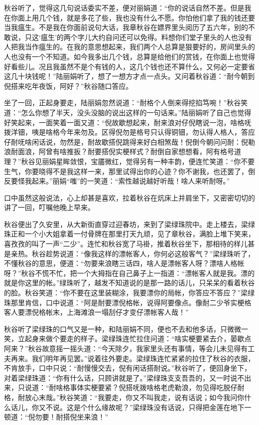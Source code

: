 \documentclass[12pt,UTF8]{ctexbook}
\begin{document}
{{{秋谷听了，觉得这几句说话委实不差，便对丽娟道：“你的说话自然不差。但是我在你面上用几个钱，就是多花了些，我也没有什么不愿。你怕他们拿了我的钱还要当我瘟生。不是我在你面前说句大话，我章秋谷在嫖界里头阅历了五六年，别的不敢说，只这‘瘟生’的两个字儿大约自问还可以免得。料想你们堂子里头的人也没有人把我当作瘟生的。在我的意思想起来，我们两个人总算是狠要好的，房间里头的人也没有一个不知道。如今我多出几个钱，总算是给他们的赏钱，在你面上也觉得好看些儿。况且我虽然不是个有钱的人，这几个钱也还不算什么，又何必一定要省这几十块钱呢！”陆丽娟听了，想了一想方才点一点头。又问着秋谷道：“耐今朝到倪搭来吃年夜饭，阿好？”秋谷随口答应。

坐了一回，正起身要走，陆丽娟忽然说道：“耐格个人倒来得挖掐笃啘！”秋谷笑道：“怎么你想了半天，没头没脑的说出这样的一句话来。”陆丽娟听了自己也觉得好笑起来，一面笑着一面又道：“倪故歇想起来，耐来浪对仔倪瞎说一泡，啥格呒拨洋钿，咦是啥格今年来勿及。区得倪勿是格号只认得铜钿，勿认得人格人，答应仔耐呒啥闲话说，勿然是，耐故歇搭倪跳得来好白相煞哉！倪倒今朝问问耐：倪勒浪耐面浪，阿曾有啥推扳？耐要搭倪实梗样式？耐倒自家想想看，阿有格号道理？”秋谷见丽娟星眸敛恨，宝靥微红，觉得另有一种丰韵，便连忙笑道：“你不要生气，你要晓得不是我这样一来，那里试得出你的心迹？你不谢我，也还罢了，倒反要怪我起来。”丽娟“嗤”的一笑道：“索性越说越好听哉！啥人来听耐呀。”

口中虽然这般说法，心上却甚是喜欢，拉着秋谷在炕床上并肩坐下，又密密切切的讲了一回，叮嘱他晚上早来。

秋谷便出了久安里，从大新街直穿过迎春坊，来到了梁绿珠院中。走上楼去，梁绿珠正和一个小大姐拿着一付骨牌在那里打天九顽，见了章秋谷，满脸上堆下笑来，喜孜孜的叫了一声“二少”。连忙和秋谷宽了马褂，推着秋谷坐下，那相待的样儿甚是亲热。秋谷趁势说道：“像我这样的漂帐客人，你何必这般客气？”梁绿珠听了，不懂秋谷的意思，便道：“勿要来浪瞎三话四，啥人是漂帐客人呀？漂啥人格帐呀？”秋谷不慌不忙，把一个大拇指在自己鼻子上一指道：“漂帐客人就是我。漂的就是你这里的帐。”绿珠听了，越发不知道说的是那一路的话儿，只呆呆的看着秋谷的脸。秋谷笑道：“你不要在这里装糊涂，我要漂你的局帐，你答应不答应？”梁绿珠那里肯信，口中说道：“阿是耐要漂倪格帐，说得阿要像点。像耐二少爷实梗格客人要漂倪格帐末，上海滩浪一塌刮仔才变仔漂帐客人哉！”

秋谷听了梁绿珠的口气又是一种，和陆丽娟不同，便也不去和他多话，只微微一笑，立起身来做个要走的样子。梁绿珠连忙拉住问道：“啥实梗要紧去介，晏歇点阿来？”秋谷故意摇一摇头道：“今天除夕，我家里头还有事情，等会儿未见得有工夫再来。我们明年再见罢。”说着往外要走。梁绿珠连忙紧紧的拉住了秋谷的衣服，不肯放手，口中只说：“耐慢慢交去，倪有闲话搭耐说。”秋谷听了，便回身坐下，对着梁绿珠道：“你有什么话，只顾讲就是了。”梁绿珠支支吾吾的，又一时说不出来，只说道：“耐啥格事体实梗要紧？倪搭呒拨啥格老虎勒浪，勿见得吃脱仔耐格，耐放心末哉。”秋谷笑道：“我要走，你又不叫我走，说有话说；如今我问你什么话儿，你又不说。这是个什么缘故呢？”梁绿珠没有话说，只得把金莲在地下一顿道：“倪勿要！耐搭倪坐来浪！”

}}}
\end{document}
